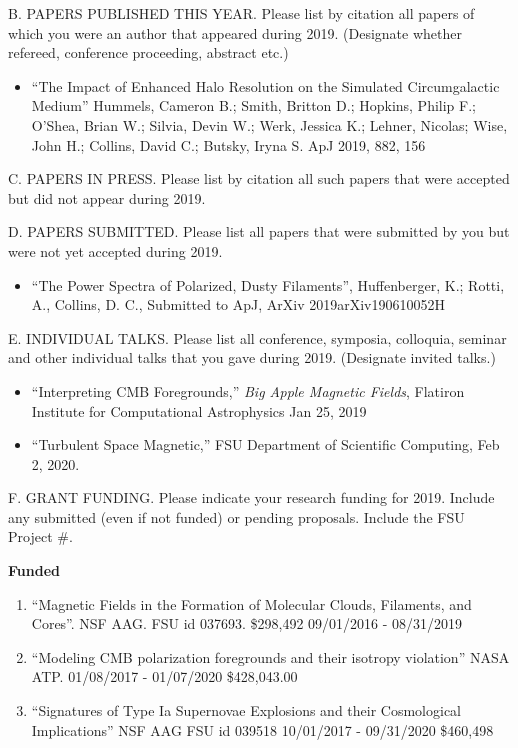 \newpage

\noindent B. PAPERS PUBLISHED THIS YEAR. Please list by citation all
papers of which you were an author that appeared during 2019.
(Designate whether refereed, conference proceeding, abstract etc.)
\bigskip

\begin{itemize}
    \item
``The Impact of Enhanced Halo Resolution on the Simulated Circumgalactic Medium''
Hummels, Cameron B.; Smith, Britton D.; Hopkins, Philip F.; O'Shea, Brian W.; Silvia, Devin W.; 
Werk, Jessica K.; Lehner, Nicolas; Wise, John H.; Collins, David C.; Butsky, Iryna S.   
ApJ 2019, 882, 156 
\end{itemize}


\noindent C. PAPERS IN PRESS. Please list by citation all such
papers that were accepted but did not appear during 2019.
\bigskip


\noindent D. PAPERS SUBMITTED. Please list all papers that were
submitted by you but were not yet accepted during 2019.
\bigskip
\begin{itemize}
    \item ``The Power Spectra of Polarized, Dusty Filaments'', Huffenberger, K.;
        Rotti,
        A., Collins, D. C., Submitted to ApJ, ArXiv 2019arXiv190610052H
\end{itemize}


\noindent E. INDIVIDUAL TALKS. Please list all conference, symposia,
colloquia, seminar and other individual talks that you gave during
2019.  (Designate invited talks.)
\bigskip

\begin{itemize}
    \item ``Interpreting CMB Foregrounds,'' \emph{Big Apple Magnetic Fields},
        Flatiron Institute for Computational Astrophysics Jan 25, 2019
    \item ``Turbulent Space Magnetic,'' FSU Department of Scientific Computing,
        Feb 2, 2020.
\end{itemize}

\noindent F. GRANT FUNDING. Please indicate your research funding
for 2019. Include any submitted  (even if not funded) or pending
proposals.   Include the FSU Project \#.
\bigskip
%

\textbf{Funded}
\begin{enumerate}
    \item ``Magnetic Fields in the Formation of Molecular Clouds,
Filaments, and Cores''.  NSF AAG. FSU id 037693.  \$298,492 09/01/2016 - 08/31/2019
\item  ``Modeling CMB polarization foregrounds and their isotropy violation''
    NASA ATP.  01/08/2017 - 01/07/2020  \$428,043.00
\item ``Signatures of Type Ia Supernovae Explosions and their Cosmological
    Implications'' NSF AAG FSU id 039518 10/01/2017 - 09/31/2020 \$460,498
\end{enumerate}


